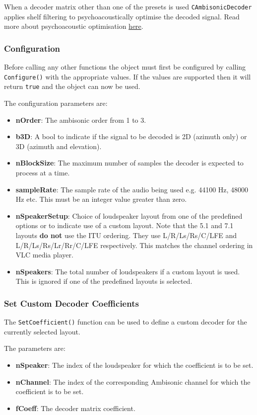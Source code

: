\documentclass[12pt]{report}
\newcommand{\code}[1]{\texttt{#1}}
\begin{document}
When a decoder matrix other than one of the presets is used \code{CAmbisonicDecoder} applies shelf filtering to psychoacoustically optimise the decoded signal. Read more about psychoacoustic optimisation \href{AmbisonicOptimisation.md}{here}.

\subsubsection{Configuration}

Before calling any other functions the object must first be configured by calling \code{Configure()} with the appropriate values. If the values are supported then it will return \code{true} and the object can now be used.

The configuration parameters are:
\begin{itemize}
    \item \textbf{nOrder}: The ambisonic order from 1 to 3.
    \item \textbf{b3D}: A bool to indicate if the signal to be decoded is 2D (azimuth only) or 3D (azimuth and elevation).
    \item \textbf{nBlockSize}: The maximum number of samples the decoder is expected to process at a time.
    \item \textbf{sampleRate}: The sample rate of the audio being used e.g. 44100 Hz, 48000 Hz etc. This must be an integer value greater than zero.
    \item \textbf{nSpeakerSetup}: Choice of loudspeaker layout from one of the predefined options or to indicate use of a custom layout. Note that the 5.1 and 7.1 layouts \textbf{do not} use the ITU ordering. They use L/R/Ls/Rs/C/LFE and L/R/Ls/Rs/Lr/Rr/C/LFE respectively. This matches the channel ordering in VLC media player.
    \item \textbf{nSpeakers}: The total number of loudspeakers if a custom layout is used. This is ignored if one of the predefined layouts is selected.
\end{itemize}

\subsubsection{Set Custom Decoder Coefficients}

The \code{SetCoefficient()} function can be used to define a custom decoder for the currently selected layout.

The parameters are:
\begin{itemize}
    \item \textbf{nSpeaker}: The index of the loudspeaker for which the coefficient is to be set.
    \item \textbf{nChannel}: The index of the corresponding Ambisonic channel for which the coefficient is to be set.
    \item \textbf{fCoeff}: The decoder matrix coefficient.
\end{itemize}
\end{document}
